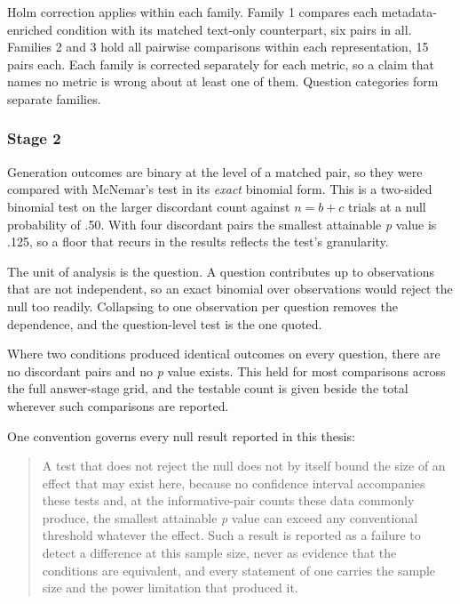 Holm correction \parencite{holm1979} applies within each family. Family 1
compares each metadata-enriched condition with its matched text-only
counterpart, six pairs in all. Families 2 and 3 hold all pairwise comparisons
within each representation, 15 pairs each. Each family is corrected separately
for each metric, so a claim that names no metric is wrong about at least one of
them. Question categories form separate families.

\subsubsection{Stage 2}

Generation outcomes are binary at the level of a matched pair, so they were
compared with McNemar's test \parencite{mcnemar1947} in its \emph{exact} binomial
form. This is a two-sided binomial test on the larger discordant count against
$n = b + c$ trials at a null probability of .50. With four discordant pairs the
smallest attainable \emph{p} value is .125, so a floor that recurs in the
results reflects the test's granularity.

The unit of analysis is the question. A question contributes up to
\thesisNumConditions{} observations that are not independent, so an exact
binomial over observations would reject the null too readily. Collapsing to one
observation per question removes the dependence, and the question-level test is
the one quoted.

Where two conditions produced identical outcomes on every question, there are no
discordant pairs and no \emph{p} value exists. This held for most comparisons
across the full answer-stage grid, and the testable count is given beside the
total wherever such comparisons are reported.

One convention governs every null result reported in this thesis:

\begin{quote}
A test that does not reject the null does not by itself bound the size of an
effect that may exist here, because no confidence interval accompanies these
tests and, at the informative-pair counts these data commonly produce, the
smallest attainable \emph{p} value can exceed any conventional threshold
whatever the effect. Such a result is reported as a failure to detect a
difference at this sample size, never as evidence that the conditions are
equivalent, and every statement of one carries the sample size and the power
limitation that produced it.
\end{quote}

